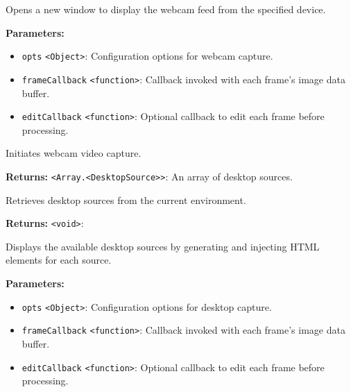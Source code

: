 \documentclass[12pt,a4paper]{article}
\begin{document}
\noindent Opens a new window to display the webcam feed from the specified device.

\vspace{5mm}
\noindent {}


\noindent \textbf{Parameters:}
\begin{itemize}
  \item \texttt{opts} \texttt{<Object>}: Configuration options for webcam capture.
  \item \texttt{frameCallback} \texttt{<function>}: Callback invoked with each frame's image data buffer.
  \item \texttt{editCallback} \texttt{<function>}: Optional callback to edit each frame before processing.
\end{itemize}

\noindent Initiates webcam video capture.

\vspace{5mm}
\noindent {}


\noindent \textbf{Returns:} \texttt{<Array.<DesktopSource>>}: An array of desktop sources.

\noindent Retrieves desktop sources from the current environment.

\vspace{5mm}
\noindent {}


\noindent \textbf{Returns:} \texttt{<void>}: 

\noindent Displays the available desktop sources by generating and injecting HTML elements for each source.

\vspace{5mm}
\noindent {}


\noindent \textbf{Parameters:}
\begin{itemize}
  \item \texttt{opts} \texttt{<Object>}: Configuration options for desktop capture.
  \item \texttt{frameCallback} \texttt{<function>}: Callback invoked with each frame's image data buffer.
  \item \texttt{editCallback} \texttt{<function>}: Optional callback to edit each frame before processing.
\end{itemize}
\end{document}
